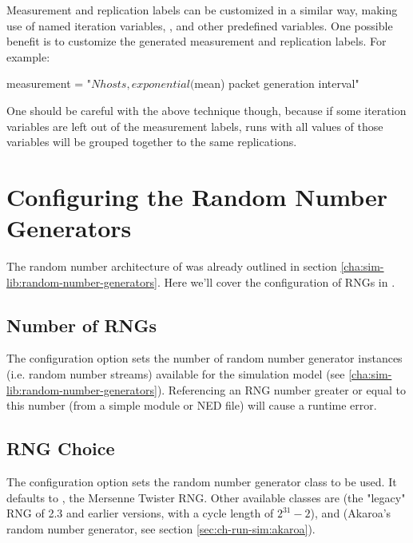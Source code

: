 Measurement and replication labels can be customized in a similar way,
making use of named iteration variables, ,
 and other predefined variables. One possible benefit is
to customize the generated measurement and replication labels. For
example:

\begin{inifile}
measurement = "${N} hosts, exponential(${mean}) packet generation interval"
\end{inifile}

One should be careful with the above technique though, because if some
iteration variables are left out of the measurement labels, runs with
all values of those variables will be grouped together to the same
replications.


\section{Configuring the Random Number Generators}
\label{sec:ch-config-sim:rng-config}

The random number architecture of {\opp} was already outlined
in section \ref{cha:sim-lib:random-number-generators}. Here
we'll cover the configuration of RNGs in .

\subsection{Number of RNGs}

The  configuration option sets the number of
random number generator instances (i.e. random number streams)
available for the simulation model (see \ref{cha:sim-lib:random-number-generators}).
Referencing an RNG number greater or equal to this number
(from a simple module or NED file) will cause a runtime error.


\subsection{RNG Choice}

The  configuration option sets the random number
generator class to be used. It defaults to ,
the Mersenne Twister RNG. Other available classes are 
(the "legacy" RNG of {\opp} 2.3 and earlier versions, with a cycle length
of $2^{31}-2$), and  (Akaroa's random number generator,
see section \ref{sec:ch-run-sim:akaroa}).

